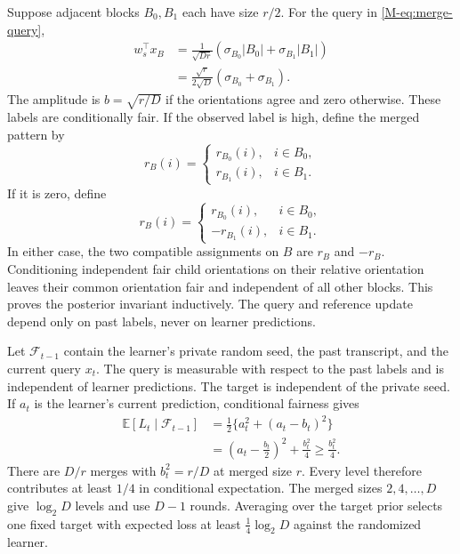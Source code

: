 \documentclass[twoside]{article}
\begin{document}
Suppose adjacent blocks $B_0,B_1$ each have size $r/2$. For the query in \eqref{M-eq:merge-query},
\begin{align}
w_s^\top x_B
&=\frac{1}{\sqrt{Dr}}\left(\sigma_{B_0}|B_0|+\sigma_{B_1}|B_1|\right)\\
&=\frac{\sqrt r}{2\sqrt D}(\sigma_{B_0}+\sigma_{B_1}).
\end{align}
The amplitude is $b=\sqrt{r/D}$ if the orientations agree and zero otherwise. These labels are conditionally fair. If the observed label is high, define the merged pattern by
\begin{equation}
r_B(i)=\begin{cases}r_{B_0}(i),&i\in B_0,\\r_{B_1}(i),&i\in B_1.\end{cases}
\end{equation}
If it is zero, define
\begin{equation}
r_B(i)=\begin{cases}r_{B_0}(i),&i\in B_0,\\-r_{B_1}(i),&i\in B_1.\end{cases}
\end{equation}
In either case, the two compatible assignments on $B$ are $r_B$ and $-r_B$. Conditioning independent fair child orientations on their relative orientation leaves their common orientation fair and independent of all other blocks. This proves the posterior invariant inductively. The query and reference update depend only on past labels, never on learner predictions.

Let $\mathcal F_{t-1}$ contain the learner's private random seed, the past transcript, and the current query $x_t$. The query is measurable with respect to the past labels and is independent of learner predictions. The target is independent of the private seed. If $a_t$ is the learner's current prediction, conditional fairness gives
\begin{align}
\mathbb E[L_t\mid\mathcal F_{t-1}]
&=\frac12\{a_t^2+(a_t-b_t)^2\}\nonumber\\
&=\left(a_t-\frac{b_t}{2}\right)^2+\frac{b_t^2}{4}\geq\frac{b_t^2}{4}.
\label{eq:conditional-merge-loss}
\end{align}
There are $D/r$ merges with $b_t^2=r/D$ at merged size $r$. Every level therefore contributes at least $1/4$ in conditional expectation. The merged sizes $2,4,\ldots,D$ give $\log_2D$ levels and use $D-1$ rounds. Averaging over the target prior selects one fixed target with expected loss at least $\frac14\log_2D$ against the randomized learner.
\end{document}
